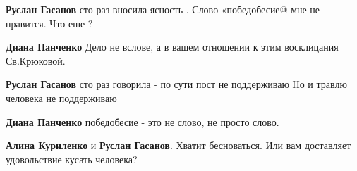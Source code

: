 \begin{itemize}
\begin{itemize}

 
\textbf{Руслан Гасанов} сто раз вносила ясность . Слово «победобесие@ мне не нравится. Что еше ?

 
\textbf{Диана Панченко} Дело не вслове, а в вашем отношении к этим восклицания Св.Крюковой.


 
\textbf{Руслан Гасанов} сто раз говорила - по сути пост не поддерживаю
Но и травлю человека не поддерживаю

 
\textbf{Диана Панченко} победобесие - это не слово, не просто слово.

 
\textbf{Алина Куриленко} и \textbf{Руслан Гасанов}. Хватит бесноваться. Или вам доставляет удовольствие кусать человека?

 

\end{itemize}
\end{itemize}
